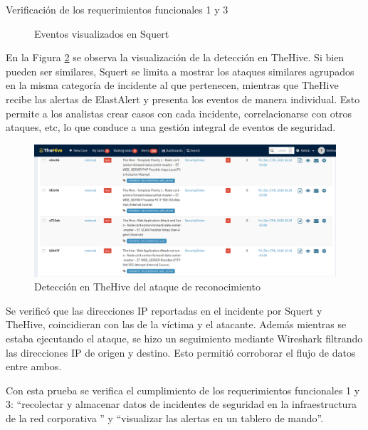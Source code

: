 \begin{section}{Verificación de los requerimientos funcionales 1 y 3}
\begin{figure}[H]
        \caption{Eventos visualizados en Squert}
        \label{fig:squert-nmap}
    \end{figure}
    \FloatBarrier
    En la Figura \ref{fig:thehive-nmap} se observa la visualización de la detección en TheHive. Si bien pueden ser similares, Squert se limita a mostrar los ataques similares agrupados en la misma categoría de incidente al que pertenecen, mientras que TheHive recibe las alertas de ElastAlert y presenta los eventos de manera individual. Esto permite a los analistas crear casos con cada incidente, correlacionarse con otros ataques, etc, lo que conduce a una gestión integral de eventos de seguridad.
    \begin{figure}[H]
        \centering
        \includegraphics[width=1\textwidth]{./iteracion_1_imagenes/TheHive-NMAP.png}
        \caption{Detección en TheHive del ataque de reconocimiento}
        \label{fig:thehive-nmap}
    \end{figure}
    \FloatBarrier
    Se verificó que las direcciones IP reportadas en el incidente por Squert y TheHive, coincidieran con las de la víctima y el atacante. Además mientras se estaba ejecutando el ataque, se hizo un seguimiento mediante Wireshark \cite{wireshark} filtrando las direcciones IP de origen y destino. Esto permitió corroborar el flujo de datos entre ambos.\par
    Con esta prueba se verifica el cumplimiento de los requerimientos funcionales 1 y 3: “recolectar y almacenar datos de incidentes de seguridad en la infraestructura de la red corporativa ” y “visualizar las alertas en un tablero de mando”.
    \end{section}
